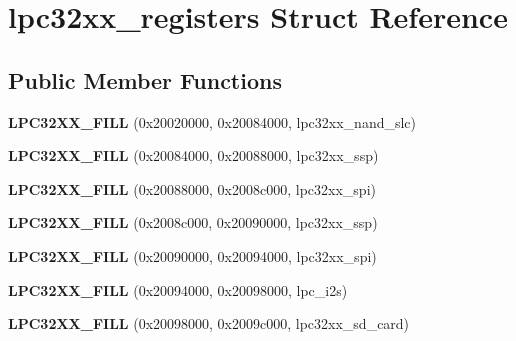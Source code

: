 \hypertarget{structlpc32xx__registers}{}\section{lpc32xx\+\_\+registers Struct Reference}
\label{structlpc32xx__registers}
\subsection*{Public Member Functions}
\begin{DoxyCompactItemize}
\item 
\mbox{\label{structlpc32xx__registers_a2c0bb29afd6aed80f898715651048d1c}} 
{\bfseries L\+P\+C32\+X\+X\+\_\+\+F\+I\+LL} (0x20020000, 0x20084000, lpc32xx\+\_\+nand\+\_\+slc)
\item 
\mbox{\label{structlpc32xx__registers_ad0b4fc8693d088aec440c029175d60b2}} 
{\bfseries L\+P\+C32\+X\+X\+\_\+\+F\+I\+LL} (0x20084000, 0x20088000, lpc32xx\+\_\+ssp)
\item 
\mbox{\label{structlpc32xx__registers_aa024b4e33289bb51bdd843bc9f64809d}} 
{\bfseries L\+P\+C32\+X\+X\+\_\+\+F\+I\+LL} (0x20088000, 0x2008c000, lpc32xx\+\_\+spi)
\item 
\mbox{\label{structlpc32xx__registers_a105eb069470ee7ccebbba0ad6ffff3f7}} 
{\bfseries L\+P\+C32\+X\+X\+\_\+\+F\+I\+LL} (0x2008c000, 0x20090000, lpc32xx\+\_\+ssp)
\item 
\mbox{\label{structlpc32xx__registers_a8ebf32e2781913fac8d5c6754b32ca64}} 
{\bfseries L\+P\+C32\+X\+X\+\_\+\+F\+I\+LL} (0x20090000, 0x20094000, lpc32xx\+\_\+spi)
\item 
\mbox{\label{structlpc32xx__registers_a747b6bf35e90b85c74b94eeb8d0a87e0}} 
{\bfseries L\+P\+C32\+X\+X\+\_\+\+F\+I\+LL} (0x20094000, 0x20098000, lpc\+\_\+i2s)
\item 
\mbox{\label{structlpc32xx__registers_a1c553c5af5fc538fb61c26654b74646a}} 
{\bfseries L\+P\+C32\+X\+X\+\_\+\+F\+I\+LL} (0x20098000, 0x2009c000, lpc32xx\+\_\+sd\+\_\+card)
\item 

\end{DoxyCompactItemize}
